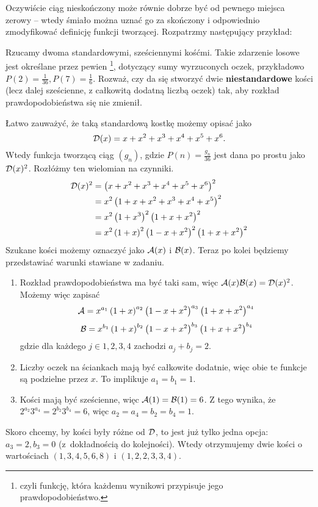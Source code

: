 \documentclass{scrartcl}
\begin{document}
    Oczywiście ciąg nieskończony może równie dobrze być od pewnego miejsca zerowy -- wtedy śmiało można uznać go za skończony i odpowiednio zmodyfikować definicję funkcji tworzącej. Rozpatrzmy następujący przykład:
    \begin{example}
        Rzucamy dwoma standardowymi, sześciennymi kośćmi. Takie zdarzenie losowe jest określane przez pewien \footnote{czyli funkcję, która każdemu wynikowi przypisuje jego prawdopodobieństwo.}, dotyczący sumy wyrzuconych oczek, przykładowo $P(2) = \frac{1}{36}, P(7) = \frac{1}{6}$. Rozważ, czy da się stworzyć dwie \textbf{niestandardowe} kości (lecz dalej sześcienne, z całkowitą dodatną liczbą oczek) tak, aby rozkład prawdopodobieństwa się nie zmienił.
    \end{example}
    \begin{solution}
        Łatwo zauważyć, że taką standardową kostkę możemy opisać jako
        $$ \mathcal D(x) = x + x^2 + x^3 + x^4 + x^5 + x^6. $$
        Wtedy funkcja tworzącą ciąg $(g_n)$, gdzie $P(n) = \frac{g_n}{36}$ jest dana po prostu jako $\mathcal D(x)^2$. Rozłóżmy ten wielomian na czynniki.
        \begin{align*}
            \mathcal D(x)^2 &= \left(x + x^2 + x^3 + x^4 + x^5 + x^6\right)^2 \\
                    &= x^2\left(1 + x + x^2 + x^3 + x^4 + x^5\right)^2 \\
                    &= x^2\left(1 + x^3\right)^2\left(1 + x + x^2\right)^2 \\
                    &= x^2\left(1 + x\right)^2\left(1 - x + x^2\right)^2\left(1 + x + x^2\right)^2
        \end{align*}
        Szukane kości możemy oznaczyć jako $\mathcal A(x)$ i $\mathcal B(x)$. Teraz po kolei będziemy przedstawiać warunki stawiane w zadaniu.
        \begin{enumerate}
            \item Rozkład prawdopodobieństwa ma być taki sam, więc $\mathcal A(x)\mathcal B(x) = \mathcal D(x)^2$. Możemy więc zapisać
            $$ \mathcal A = x^{a_1}\left(1 + x\right)^{a_2}\left(1 - x + x^2\right)^{a_3}\left(1 + x + x^2\right)^{a_4} $$
            $$ \mathcal B = x^{b_1}\left(1 + x\right)^{b_2}\left(1 - x + x^2\right)^{b_3}\left(1 + x + x^2\right)^{b_4} $$
            gdzie dla każdego $j\in{1,2,3,4}$ zachodzi $a_j + b_j = 2$.
            \item Liczby oczek na ściankach mają być całkowite dodatnie, więc obie te funkcje są podzielne przez $x$. To implikuje $a_1 = b_1 = 1$.
            \item Kości mają być sześcienne, więc $\mathcal A(1) = \mathcal B(1) = 6$. Z tego wynika, że $2^{a_2}3^{a_4} = 2^{b_2}3^{b_4} = 6$, więc $a_2 = a_4 = b_2 = b_4 = 1$.
        \end{enumerate}
        Skoro chcemy, by kości były różne od $\mathcal D$, to jest już tylko jedna opcja: $a_3 = 2, b_3 = 0$ (z~dokładnością do kolejności). Wtedy otrzymujemy dwie kości o wartościach $(1, 3, 4, 5, 6, 8)$ i $(1, 2, 2, 3, 3, 4)$.
    \end{solution}
\end{document}
